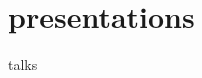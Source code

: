 \documentclass[]{friggeri-cv}
\begin{document}






\section{presentations}


{\subfont\large{} talks}
\end{document}
